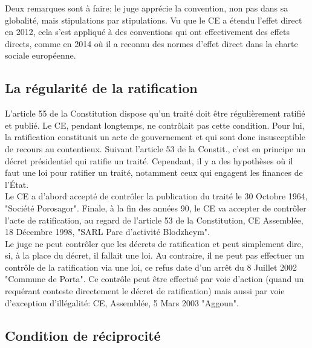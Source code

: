 \documentclass[10pt, a4paper, openany]{book}
\begin{document}
Deux remarques sont à faire: le juge apprécie la convention, non pas dans sa globalité, mais stipulations par stipulations. Vu que le CE a étendu l'effet direct en 2012, cela s'est appliqué à des conventions qui ont effectivement des effets directs, comme en 2014 où il a reconnu des normes d'effet direct dans la charte sociale européenne. 

\subsection{La régularité de la ratification}

L'article 55 de la Constitution dispose qu'un traité doit être régulièrement ratifié et publié. Le CE, pendant longtemps, ne contrôlait pas cette condition. Pour lui, la ratification constituait un acte de gouvernement et qui sont donc insusceptible de recours au contentieux. Suivant l'article 53 de la Constit., c'est en principe un décret présidentiel qui ratifie un traité. Cependant, il y a des hypothèses où il faut une loi pour ratifier un traité, notamment ceux qui engagent les finances de l'État. \\
Le CE a d'abord accepté de contrôler la publication du traité le 30 Octobre 1964, "Société Porosagor". Finale, à la fin des années 90, le CE va accepter de contrôler l'acte de ratification, au regard de l'article 53 de la Constitution, CE Assemblée, 18 Décembre 1998, "SARL Parc d'activité Blodzheym". \\
Le juge ne peut contrôler que les décrets de ratification et peut simplement dire, si, à la place du décret, il fallait une loi. Au contraire, il ne peut pas effectuer un contrôle de la ratification via une loi, ce refus date d'un arrêt du 8 Juillet 2002 "Commune de Porta". Ce contrôle peut être effectué par voie d'action (quand un requérant conteste directement le décret de ratification) mais aussi par voie d'exception d'illégalité: CE, Assemblée, 5 Mars 2003 "Aggoun". 

\subsection{Condition de réciprocité}
\end{document}
